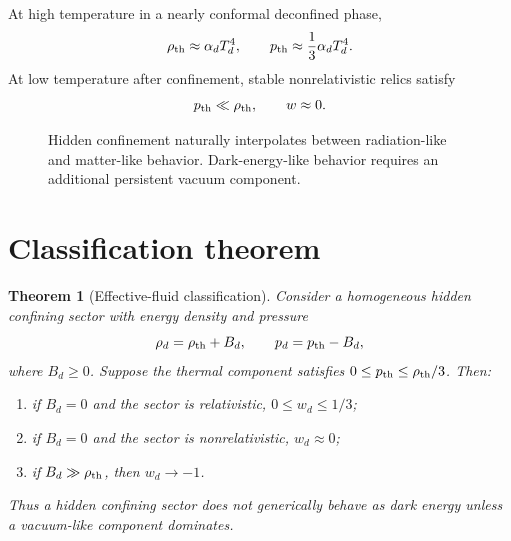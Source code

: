 \documentclass[11pt]{article}
\newtheorem{theorem}{Theorem}
\theoremstyle{remark}
\begin{document}
At high temperature in a nearly conformal deconfined phase,
\begin{equation}
\rho_{\rm th}\approx \alpha_d T_d^4,
\qquad
p_{\rm th}\approx \frac13\alpha_d T_d^4.
\end{equation}
At low temperature after confinement, stable nonrelativistic relics satisfy
\begin{equation}
p_{\rm th}\ll \rho_{\rm th},
\qquad w\approx0.
\end{equation}

\begin{figure}[h]
\centering
{}
\caption{Hidden confinement naturally interpolates between radiation-like and matter-like behavior. Dark-energy-like behavior requires an additional persistent vacuum component.}
\end{figure}

\section{Classification theorem}

\begin{theorem}[Effective-fluid classification]
Consider a homogeneous hidden confining sector with energy density and pressure
\begin{equation}
\rho_d=\rho_{\rm th}+B_d,
\qquad
p_d=p_{\rm th}-B_d,
\end{equation}
where $B_d\ge0$. Suppose the thermal component satisfies $0\le p_{\rm th}\le \rho_{\rm th}/3$. Then:
\begin{enumerate}[label=(\roman*)]
\item if $B_d=0$ and the sector is relativistic, $0\le w_d\le1/3$;
\item if $B_d=0$ and the sector is nonrelativistic, $w_d\approx0$;
\item if $B_d\gg\rho_{\rm th}$, then $w_d\to-1$.
\end{enumerate}
Thus a hidden confining sector does not generically behave as dark energy unless a vacuum-like component dominates.
\end{theorem}
\end{document}
